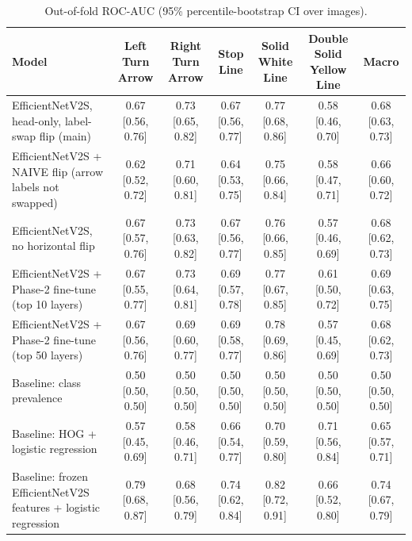 \begin{table}[t]
\centering
\small
\caption{Out-of-fold ROC-AUC (95\% percentile-bootstrap CI over images).}
\begin{tabular}{lcccccc}
\toprule
Model & Left Turn Arrow & Right Turn Arrow & Stop Line & Solid White Line & Double Solid Yellow Line & Macro \\
\midrule
EfficientNetV2S, head-only, label-swap flip  (main) & 0.67 [0.56, 0.76] & 0.73 [0.65, 0.82] & 0.67 [0.56, 0.77] & 0.77 [0.68, 0.86] & 0.58 [0.46, 0.70] & 0.68 [0.63, 0.73] \\
EfficientNetV2S + NAIVE flip (arrow labels not swapped) & 0.62 [0.52, 0.72] & 0.71 [0.60, 0.81] & 0.64 [0.53, 0.75] & 0.75 [0.66, 0.84] & 0.58 [0.47, 0.71] & 0.66 [0.60, 0.72] \\
EfficientNetV2S, no horizontal flip & 0.67 [0.57, 0.76] & 0.73 [0.63, 0.82] & 0.67 [0.56, 0.77] & 0.76 [0.66, 0.85] & 0.57 [0.46, 0.69] & 0.68 [0.62, 0.73] \\
EfficientNetV2S + Phase-2 fine-tune (top 10 layers) & 0.67 [0.55, 0.77] & 0.73 [0.64, 0.81] & 0.69 [0.57, 0.78] & 0.77 [0.67, 0.85] & 0.61 [0.50, 0.72] & 0.69 [0.63, 0.75] \\
EfficientNetV2S + Phase-2 fine-tune (top 50 layers) & 0.67 [0.56, 0.76] & 0.69 [0.60, 0.77] & 0.69 [0.58, 0.77] & 0.78 [0.69, 0.86] & 0.57 [0.45, 0.69] & 0.68 [0.62, 0.73] \\
Baseline: class prevalence & 0.50 [0.50, 0.50] & 0.50 [0.50, 0.50] & 0.50 [0.50, 0.50] & 0.50 [0.50, 0.50] & 0.50 [0.50, 0.50] & 0.50 [0.50, 0.50] \\
Baseline: HOG + logistic regression & 0.57 [0.45, 0.69] & 0.58 [0.46, 0.71] & 0.66 [0.54, 0.77] & 0.70 [0.59, 0.80] & 0.71 [0.56, 0.84] & 0.65 [0.57, 0.71] \\
Baseline: frozen EfficientNetV2S features + logistic regression & 0.79 [0.68, 0.87] & 0.68 [0.56, 0.79] & 0.74 [0.62, 0.84] & 0.82 [0.72, 0.91] & 0.66 [0.52, 0.80] & 0.74 [0.67, 0.79] \\
\bottomrule
\end{tabular}
\end{table}
